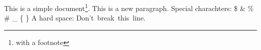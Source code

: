 \documentclass[a4paper,12pt]{article}
\begin{document}
This is a simple document\footnote{with a footnote}.
This is a new paragraph.
Special charachters: \$ \& \% \# \_ \{ \}
A hard space: Don't~break~this~line.
\end{document}
